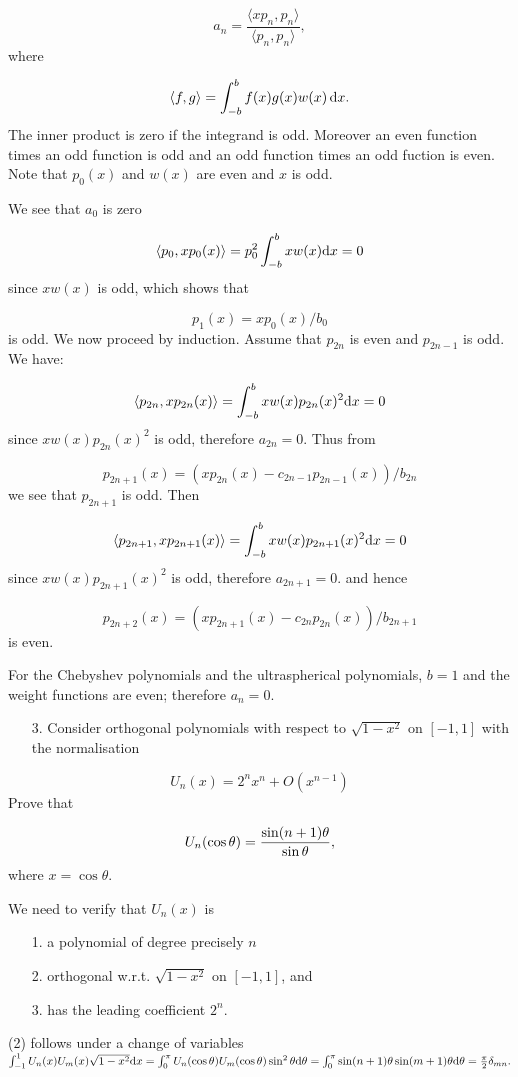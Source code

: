 \documentclass[12pt,a4paper]{article}
\begin{document}
\[
a_n = \frac{\langle xp_n, p_n\rangle}{\langle p_n, p_n\rangle},
\]
where

\[
\langle f, g \rangle = \int_{-b}^{b} f(x)g(x)w(x)\,{\rm d}x.
\]
The inner product is zero if the integrand is odd.  Moreover an even function times an odd function is odd and an odd function times an odd fuction is even. Note that $p_0(x)$ and $w(x)$ are even and $x$ is odd. 

We see that $a_0$ is zero

\[
\ensuremath{\langle}p_0,x p_0(x)\ensuremath{\rangle} = p_0^2\int_{-b}^b x w(x) {\rm d} x = 0
\]
since $xw(x)$ is odd, which shows that

\[
p_1(x) = xp_0(x)/b_0
\]
is odd. We now proceed by induction. Assume that $p_{2n}$ is even and $p_{2n-1}$ is odd. We have:

\[
\ensuremath{\langle}p_{2n},x p_{2n}(x)\ensuremath{\rangle} = \int_{-b}^b x w(x) p_{2n}(x)^2 {\rm d} x = 0
\]
since $x w(x) p_{2n}(x)^2$ is odd, therefore $a_{2n} = 0$. Thus from

\[
p_{2n+1}(x) = (x p_{2n}(x)- c_{2n-1} p_{2n-1}(x)) / b_{2n} 
\]
we see that $p_{2n+1}$ is odd. Then

\[
\ensuremath{\langle}p_{2n+1},x p_{2n+1}(x)\ensuremath{\rangle} = \int_{-b}^b x w(x) p_{2n+1}(x)^2 {\rm d} x = 0
\]
since $x w(x) p_{2n+1}(x)^2$ is odd, therefore $a_{2n+1} = 0$. and hence

\[
p_{2n+2}(x) = (x p_{2n+1}(x)- c_{2n} p_{2n}(x)) / b_{2n+1} 
\]
is even.

For the Chebyshev polynomials and the ultraspherical polynomials, $b = 1$ and the weight functions are even; therefore $a_n = 0$.

\begin{itemize}
\item[3. ] Consider orthogonal polynomials with respect to $\sqrt{1-x^2}$ on $[-1,1]$ with the normalisation

\end{itemize}
\[
U_n(x) = 2^n x^n + O(x^{n-1})
\]
Prove that

\[
U_n(\cos \ensuremath{\theta}) = {\sin(n+1) \ensuremath{\theta} \over \sin \ensuremath{\theta}},
\]
where $x = \cos\theta$.

We need to verify that $U_n(x)$ is

\begin{itemize}
\item[1. ] a polynomial of degree precisely $n$ 


\item[2. ] orthogonal w.r.t. $\sqrt{1-x^2}$ on $[-1,1]$, and


\item[3. ] has the leading coefficient $2^n$.

\end{itemize}
(2) follows under a change of variables $\int_{-1}^1U_n(x)U_m(x)\sqrt{1-x^2}{\rm d}x=\int_0^{\pi}U_n(\cos\theta)U_m(\cos\theta)\sin^2\theta{\rm d}\theta=\int_0^{\pi}\sin(n+1)\theta\sin(m+1)\theta{\rm d}\theta=\frac{\pi}{2}\delta_{mn}.$
\end{document}

